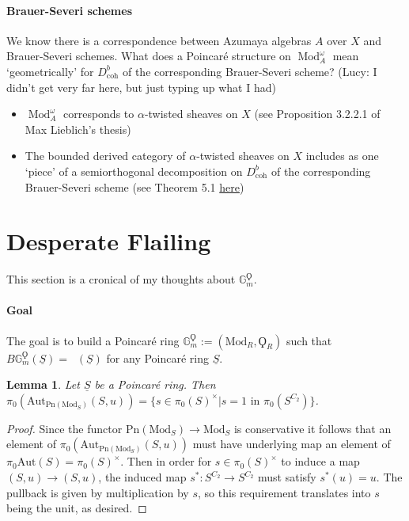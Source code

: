 \documentclass{article}
\DeclareMathOperator{\Mod}{Mod} %
\DeclareMathOperator{\Picp}{Pic^p} %
\newtheorem{lemma}[theorem]{Lemma}
\theoremstyle{definition}
\begin{document}
\paragraph{Brauer-Severi schemes} 
We know there is a correspondence between Azumaya algebras $ A $ over $ X $ and Brauer-Severi schemes. 
What does a Poincaré structure on $ \Mod_A^\omega $ mean `geometrically' for $ D^b_{\mathrm{coh}} $ of the corresponding Brauer-Severi scheme? 
(Lucy: I didn't get very far here, but just typing up what I had)
\begin{itemize}
    \item $ \Mod_A^\omega $ corresponds to $ \alpha $-twisted sheaves on $ X $ (see Proposition 3.2.2.1 of Max Lieblich's thesis)
    \item The bounded derived category of $ \alpha $-twisted sheaves on $ X $ includes as one `piece' of a semiorthogonal decomposition on $ D^b_{\mathrm{coh}} $ of the corresponding Brauer-Severi scheme (see Theorem 5.1 \href{https://arxiv.org/abs/math/0511497}{here})
\end{itemize}

\section{Desperate Flailing}

This section is a cronical of my thoughts about $\mathbb{G}_m^\Qoppa$.
\paragraph{Goal} The goal is to build a Poincar{\'e} ring $\mathbb{G}_{m}^\Qoppa:=(\mathrm{Mod}_R, \Qoppa_R)$  such that $B\mathbb{G}_m^\Qoppa(\underline{S}) = \Picp(\underline{S})$ for any Poincar{\'e} ring $\underline{S}$.
\begin{lemma}
Let $\underline{S}$ be a Poincar{\'e} ring. Then $\pi_0(\mathrm{Aut}_{\mathrm{Pn}(\mathrm{Mod}_S)}(S,u))=\{s\in \pi_0(S)^\times | s=1 \textrm{ in }\pi_0(S^{C_2})\}$.
\end{lemma}
\begin{proof}
Since the functor $\mathrm{Pn}(\mathrm{Mod}_S)\to \mathrm{Mod}_S$ is conservative it follows that an element of $\pi_0(\mathrm{Aut}_{\mathrm{Pn}(\mathrm{Mod}_S)}(S,u))$ must have underlying map an element of $\pi_0\mathrm{Aut}(S)=\pi_0(S)^\times$. Then in order for $s\in \pi_0(S)^\times$ to induce a map $(S,u)\to (S,u)$, the induced map $s^*:S^{C_2}\to S^{C_2}$ must satisfy $s^*(u)=u$. The pullback is given by multiplication by $s$, so this requirement translates into $s$ being the unit, as desired.
\end{proof}
\end{document}
